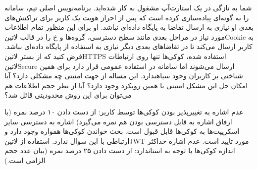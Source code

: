 
شما به تازگی در یک استارت‌آپ مشغول به کار شده‌اید.
برنامه‌نویس اصلی تیم، سامانه را به گونه‌ای پیاده‌سازی کرده است که پس از احراز هویت یک کاربر
برای تراکنش‌های بعدی او نیازی به ارسال تقاضا به پایگاه داده‌ای نباشد.
او برای این منظور تمام اطلاعات مورد نیاز در مراحل بعدی مانند سطح دسترسی، گروه‌ها و ‌خ را در قالب ‌لاتین{Cookie}
به کاربر ارسال می‌کند تا در تقاضاهای بعدی دیگر نیازی به استفاده از پایگاه داده‌ای نباشد.
فرض کنید که از بستر ‌لاتین{HTTPS} استفاده شده، کوکی‌ها تنها روی ارتباطات ‌لاتین{Secure} ارسال می‌شوند اما سامانه در استفاده عمومی قرار دارد برای همین شناختی بر کاربران وجود ‌سیاه{ندارد}.
این مساله از جهت امنیتی چه مشکلی دارد؟ آیا امکان حل این مشکل امنیتی با همین رویکرد وجود دارد؟
آیا از نظر حجم اطلاعات هم می‌توان برای این روش محدودیتی قائل شد؟


\begin{پاسخ}

 عدم اشاره به تغییرپذیر بودن کوکی‌ها توسط کاربر: از دست دادن ۱۰ درصد نمره (با ارفاق اشاره به قابل دسترسی بودن هم نمره می‌گیرد)
 اشاره به دسترسی سایر اسکریپت‌ها به کوکی‌ها قابل قبول است.
 بحث خواندن کوکی‌ها همواره وجود دارد و ارتباطی با این سوال ندارد.
 استفاده از ‌لاتین{JWT} مورد تایید است.
 عدم اشاره حداکثر اندازه کوکی‌ها با توجه به استاندارد: از دست دادن ۲۵ درصد نمره (بیان عدد حجم الزامی است.)

\end{پاسخ}
